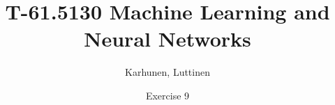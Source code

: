 
\title{T-61.5130 Machine Learning and Neural Networks}
\author{Karhunen, Luttinen}
\date{Exercise 9}

\usepackage{pdfpages}

\usepackage{subfig}


\newcommand{\vect}[1]{{\bf{#1}}}
\newcommand{\svect}[1]{\boldsymbol{#1}}
\newcommand{\matr}[1]{\boldsymbol{#1}}

\renewcommand{\vec}[1]{\mathbf{#1}}
\newcommand{\set}[1]{\mathcal{#1}}
\newcommand{\C}{\set{C}}
\newcommand{\E}{\mathcal{E}}
\newcommand{\I}{\vec{I}}
\renewcommand{\L}{\mathcal{L}}
\newcommand{\N}{\mathrm{I \negmedspace N}}
\newcommand{\R}{\mathrm{I \negmedspace R}}
\newcommand{\V}{\set{V}}
\newcommand{\W}{\vec{W}}
\newcommand{\X}{\set{X}}
\newcommand{\e}{\vec{e}}
\newcommand{\h}{\vec{h}}
\newcommand{\m}{\vec{m}}
\newcommand{\mub}{\boldsymbol{\mu}}
\newcommand{\n}{\vec{n}}
\renewcommand{\t}{\vec{t}}
\renewcommand{\u}{\vec{u}}
\renewcommand{\v}{\vec{v}}
\newcommand{\w}{\vec{w}}
\newcommand{\x}{\vec{x}}
\newcommand{\y}{\vec{y}}
\newcommand{\Y}{\vec{Y}}
\newcommand{\z}{\vec{z}}
\newcommand{\argmin}{\operatornamewithlimits{argmin}}
\newcommand{\argmax}{\operatornamewithlimits{argmax}}
\newcommand{\bSigma}{\boldsymbol{\Sigma}}





\maketitle


